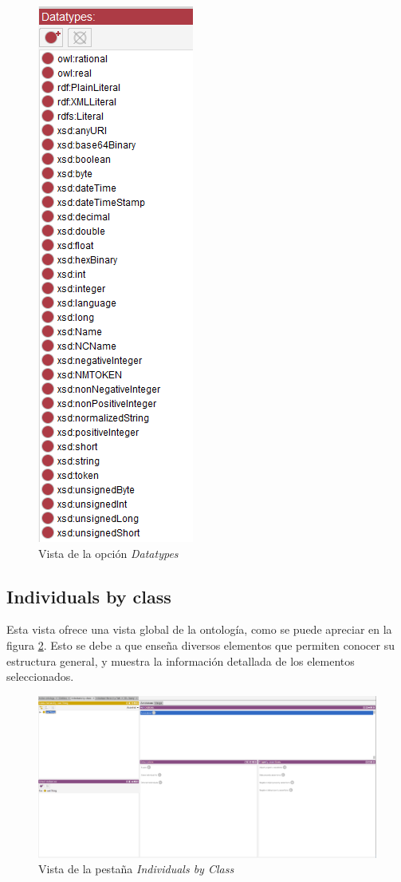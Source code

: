 \begin{figure}[H]
    \centering
    \includegraphics[scale=0.5]{Figures/Protege/Datatypes.png}
    \caption{Vista de la opción \textit{Datatypes}}
    \label{Datatypes}
\end{figure}


\subsection{Individuals by class}
Esta vista ofrece una vista global de la ontología, como se puede apreciar en la figura \ref*{IndividualsClass}. 
Esto se debe a que enseña diversos elementos que permiten conocer su estructura general, y muestra la 
información detallada de los elementos seleccionados.  

\begin{figure}[H]
    \centering
    \includegraphics[scale=0.2]{Figures/Protege/IndividualsClass.png}
    \caption{Vista de la pestaña \textit{Individuals by Class}}
    \label{IndividualsClass}
\end{figure}

